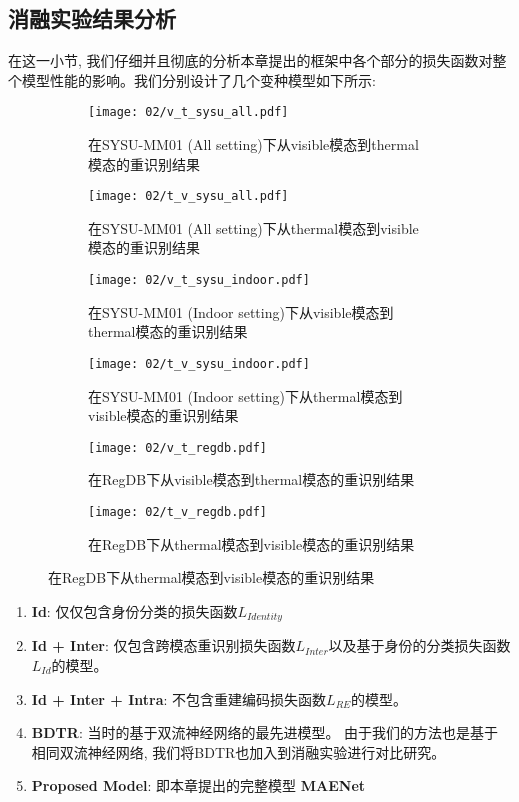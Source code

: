 \subsection{消融实验结果分析}
在这一小节, 我们仔细并且彻底的分析本章提出的框架中各个部分的损失函数对整个模型性能的影响。我们分别设计了几个变种模型如下所示:


\begin{figure}[!htp]
  \centering
  \begin{subfigure}{0.45\textwidth}
    \centering
    \texttt{[image: 02/v\_t\_sysu\_all.pdf]}
    \caption{在SYSU-MM01 (All setting)下从visible模态到thermal模态的重识别结果}
  \end{subfigure}
  \hspace{1cm}
  \begin{subfigure}{0.45\textwidth}
    \centering
    \texttt{[image: 02/t\_v\_sysu\_all.pdf]}
    \caption{在SYSU-MM01 (All setting)下从thermal模态到visible模态的重识别结果}
  \end{subfigure}
  \begin{subfigure}{0.45\textwidth}
    \centering
    \texttt{[image: 02/v\_t\_sysu\_indoor.pdf]}
    \caption{在SYSU-MM01 (Indoor setting)下从visible模态到thermal模态的重识别结果}
  \end{subfigure}
  \hspace{1cm}
  \begin{subfigure}{0.45\textwidth}
    \centering
    \texttt{[image: 02/t\_v\_sysu\_indoor.pdf]}
    \caption{在SYSU-MM01 (Indoor setting)下从thermal模态到visible模态的重识别结果}
  \end{subfigure}
  \begin{subfigure}{0.45\textwidth}
    \centering
    \texttt{[image: 02/v\_t\_regdb.pdf]}
    \caption{在RegDB下从visible模态到thermal模态的重识别结果}
  \end{subfigure}
  \hspace{1cm}
  \begin{subfigure}{0.45\textwidth}
    \centering
    \texttt{[image: 02/t\_v\_regdb.pdf]}
    \caption{在RegDB下从thermal模态到visible模态的重识别结果}
  \end{subfigure}
  \label{fig:ablation_res}
\end{figure}


\begin{enumerate}
  \item \textbf{Id}: 仅仅包含身份分类的损失函数$L_{Identity}$
  \item \textbf{Id + Inter}: 仅包含跨模态重识别损失函数$L_{Inter}$以及基于身份的分类损失函数$L_{Id} $的模型。
  \item \textbf{Id + Inter + Intra}: 不包含重建编码损失函数$L_{RE}$的模型。
  \item \textbf{BDTR}: 当时的基于双流神经网络的最先进模型。 由于我们的方法也是基于相同双流神经网络, 我们将BDTR也加入到消融实验进行对比研究。
  \item \textbf{Proposed Model}: 即本章提出的完整模型 \textbf{MAENet}
\end{enumerate}

